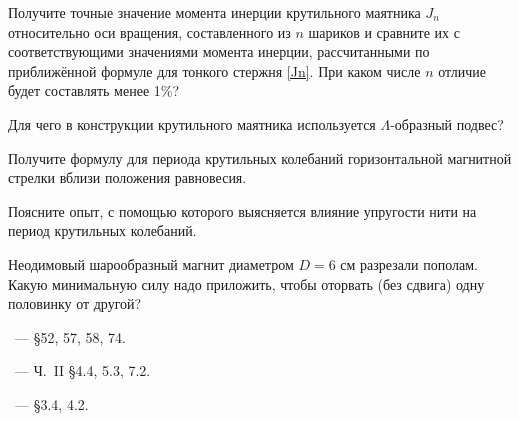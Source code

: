 \begin{lab:questions}
\item Получите точные значение момента инерции крутильного маятника  $J_n$
относительно оси вращения, составленного из  $n$ шариков и сравните
их с соответствующими значениями момента инерции, рассчитанными по приближённой
формуле для тонкого стержня \eqref{Jn}. При каком числе $n$
отличие будет составлять менее 1\%?

\item Для чего в конструкции крутильного маятника используется $\Lambda$-образный
подвес?

\item Получите формулу для периода крутильных колебаний горизонтальной магнитной
стрелки вблизи положения равновесия.

\item Поясните опыт, с помощью которого выясняется влияние упругости нити на
период крутильных колебаний.

\item Неодимовый шарообразный магнит диаметром $D=6$ см разрезали пополам. Какую
минимальную силу надо приложить, чтобы оторвать (без сдвига) одну половинку от
другой? 


\end{lab:questions}

\begin{lab:literature}
    \item \SivuhinIII~--- \S52, 57, 58, 74.
    \item \KingLokOlh~--- Ч.~II \S4.4, 5.3, 7.2.
    \item \Kirichenko~--- \S3.4, 4.2.
\end{lab:literature}



